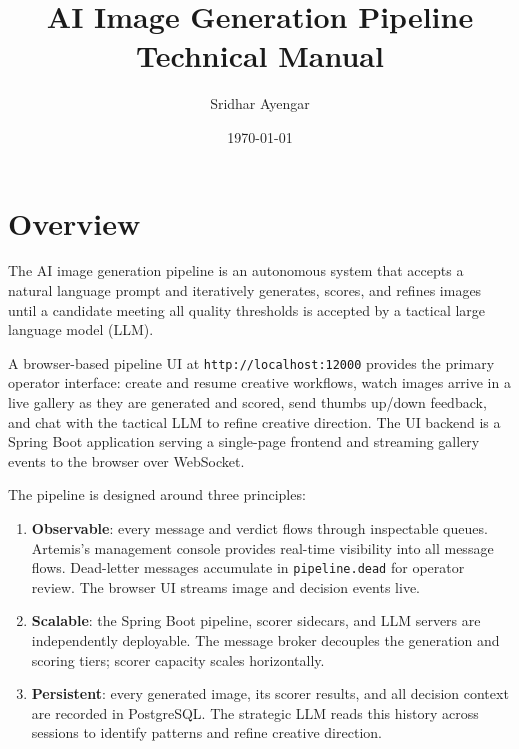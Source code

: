 \documentclass[11pt,letterpaper]{article}
\title{\textbf{AI Image Generation Pipeline}\\[0.5em]\large Technical Manual}
\author{Sridhar Ayengar}
\date{\today}
\begin{document}
\maketitle
\tableofcontents
\newpage

\section{Overview}

The AI image generation pipeline is an autonomous system that accepts a
natural language prompt and iteratively generates, scores, and refines
images until a candidate meeting all quality thresholds is accepted by a
tactical large language model (LLM).

A browser-based pipeline UI at \texttt{http://localhost:12000} provides the
primary operator interface: create and resume creative workflows, watch images
arrive in a live gallery as they are generated and scored, send thumbs
up/down feedback, and chat with the tactical LLM to refine creative direction.
The UI backend is a Spring Boot application serving a single-page frontend
and streaming gallery events to the browser over WebSocket.

The pipeline is designed around three principles:

\begin{enumerate}
  \item \textbf{Observable}: every message and verdict flows through
        inspectable queues. Artemis's management console provides real-time
        visibility into all message flows. Dead-letter messages accumulate in
        \texttt{pipeline.dead} for operator review. The browser UI streams
        image and decision events live.
  \item \textbf{Scalable}: the Spring Boot pipeline, scorer sidecars, and LLM
        servers are independently deployable. The message broker decouples
        the generation and scoring tiers; scorer capacity scales horizontally.
  \item \textbf{Persistent}: every generated image, its scorer results, and
        all decision context are recorded in PostgreSQL. The strategic LLM
        reads this history across sessions to identify patterns and refine
        creative direction.
\end{enumerate}

\end{document}
